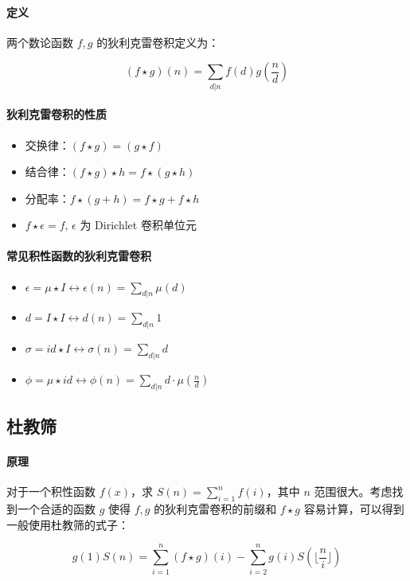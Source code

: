 \paragraph{定义} 两个数论函数 $f, g$ 的狄利克雷卷积定义为：

$$(f \star g)(n) = \sum_{d|n} f(d)g(\frac{n}{d})$$

\paragraph{狄利克雷卷积的性质}
\begin{itemize}
    \item 交换律：$(f \star g) = (g \star f)$
    \item 结合律：$(f \star g) \star h = f \star (g \star h)$
    \item 分配率：$f \star (g + h) = f \star g + f \star h$
    \item $f \star \epsilon = f$, $\epsilon$ 为 Dirichlet 卷积单位元
\end{itemize}

\paragraph{常见积性函数的狄利克雷卷积}
\begin{itemize}
    \item $\epsilon = \mu \star I \longleftrightarrow \epsilon(n) = \sum_{d|n}\mu(d)$
    \item $d = I \star I \longleftrightarrow d(n) = \sum_{d|n}1$
    \item $\sigma = id \star I \longleftrightarrow \sigma (n) = \sum_{d|n}d$
    \item $\phi = \mu \star id \longleftrightarrow \phi(n) = \sum_{d|n} d \cdot \mu(\frac{n}{d})$
\end{itemize}

\subsection{杜教筛}

\paragraph{原理} 对于一个积性函数 $f(x)$，求 $S(n) = \sum_{i=1}^{n} f(i)$，其中 $n$ 范围很大。考虑找到一个合适的函数 $g$ 使得 $f, g$ 的狄利克雷卷积的前缀和 $f \star g$ 容易计算，可以得到一般使用杜教筛的式子：

$$g(1)S(n) = \sum_{i=1}^{n} (f \star g)(i) - \sum_{i=2}^{n}g(i)S(\lfloor \frac{n}{i} \rfloor)$$


